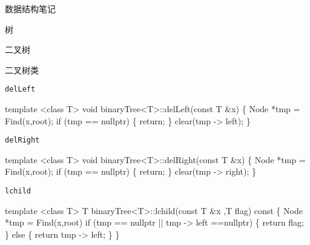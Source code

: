\documentclass[
  ignorenonframetext,
]{beamer}
\newenvironment{Shaded}{}{}
\newcommand{\NormalTok}[1]{#1}
\begin{document}
\begin{frame}[fragile]{数据结构笔记}
\begin{block}{树}
\begin{block}{二叉树}
\begin{block}{二叉树类}
\begin{block}{\texttt{delLeft}}
\protect{}\label{delleft}
\begin{Shaded}
\begin{Highlighting}[]
\NormalTok{template \textless{}class T\textgreater{}}
\NormalTok{void binaryTree\textless{}T\textgreater{}::delLeft(const T \&x)}
\NormalTok{\{}
\NormalTok{  Node *tmp = Find(x,root);}
\NormalTok{  if (tmp == nullptr)}
\NormalTok{  \{}
\NormalTok{    return;}
\NormalTok{  \}}
\NormalTok{  clear(tmp {-}\textgreater{} left);}
\NormalTok{\}}
\end{Highlighting}
\end{Shaded}
\end{block}

\begin{block}{\texttt{delRight}}
\protect{}\label{delright}
\begin{Shaded}
\begin{Highlighting}[]
\NormalTok{template \textless{}class T\textgreater{}}
\NormalTok{void binaryTree\textless{}T\textgreater{}::delRight(const T \&x)}
\NormalTok{\{}
\NormalTok{  Node *tmp = Find(x,root);}
\NormalTok{  if (tmp == nullptr)}
\NormalTok{  \{}
\NormalTok{    return;}
\NormalTok{  \}}
\NormalTok{  clear(tmp {-}\textgreater{} right);}
\NormalTok{\}}
\end{Highlighting}
\end{Shaded}
\end{block}

\begin{block}{\texttt{lchild}}
\protect{}\label{lchild}
\begin{Shaded}
\begin{Highlighting}[]
\NormalTok{template \textless{}class T\textgreater{}}
\NormalTok{T binaryTree\textless{}T\textgreater{}::lchild(const T \&x ,T flag) const}
\NormalTok{\{}
\NormalTok{  Node *tmp = Find(x,root)}
\NormalTok{  if (tmp == nullptr || tmp {-}\textgreater{} left ==nullptr)}
\NormalTok{  \{}
\NormalTok{    return flag;}
\NormalTok{  \}}
\NormalTok{  else}
\NormalTok{  \{}
\NormalTok{    return tmp {-}\textgreater{} left;}
\NormalTok{  \}}
\NormalTok{\}}
\end{Highlighting}
\end{Shaded}
\end{block}


\end{block}
\end{block}
\end{block}
\end{frame}
\end{document}
